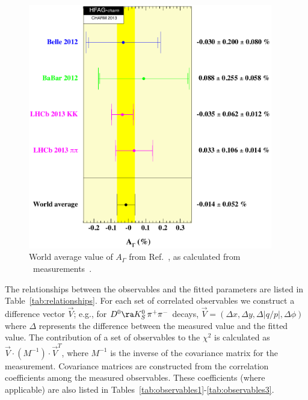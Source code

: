 \begin{figure}
\begin{center}
\includegraphics[width=4.2in]{figures/charm/a_gamma_31aug13}
\end{center}
\vskip-0.20in
\caption{\label{fig:Agamma}
World average value of $A^{}_\Gamma$ from 
Ref.~\cite{HFAG_charm:webpage}, as calculated from \dkkpp\ 
measurements~\cite{Staric:2012ta,Lees:2012qh,Aaij:2013ria}.}
\end{figure}


The relationships between the observables and the fitted
parameters are listed in Table~\ref{tab:relationships}. 
For each set of correlated observables we construct a
difference vector $\vec{V}$; e.g., for 
$D^0\ra K^0_S\,\pi^+\pi^-$ decays,
$\vec{V}=(\Delta x,\Delta y,\Delta |q/p|,\Delta \phi)$
where $\Delta$ represents the difference between the 
measured value and the fitted value. The 
contribution of a set of observables to the $\chi^2$ 
is calculated as $\vec{V}\cdot (M^{-1})\cdot\vec{V}^T$, 
where $M^{-1}$ is the inverse of the covariance matrix 
for the measurement. Covariance matrices are constructed 
from the correlation coefficients among the measured observables.
These coefficients (where applicable) are also listed in 
Tables~\ref{tab:observables1}-\ref{tab:observables3}. 

